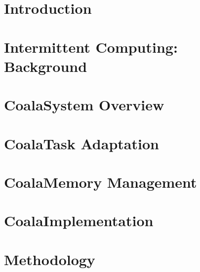 \documentclass[pageno]{jpaper}
\newcommand{\sys}{Coala}
\begin{document}
\begin{abstract}	

\end{abstract}

\section{Introduction}
\label{sec:intro}



\section{Intermittent Computing: Background}
\label{sec:background}



\section{\sys System Overview}
\label{sec:systemdescription}



\section{\sys Task Adaptation}
\label{sec:task_adaptation}




\section{\sys Memory Management}
\label{sec:memory_virtulaization}



\section{\sys Implementation}
\label{sec:implementation}




%

\section{Methodology}
\label{sec:methodology}
\end{document}
